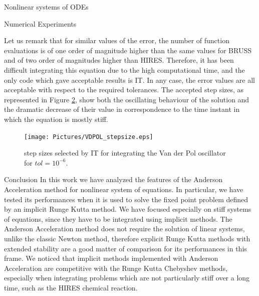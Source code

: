\documentclass{article}
\begin{document}
\begin{section}{Nonlinear systems of ODEs}
\begin{subsection}{Numerical Experiments}
\begin{figure}[t!]
\label{fig:VDPOL}
\end{figure}
Let us remark that for similar values of the error, the number of function evaluations is of one order of magnitude higher than the same values for BRUSS and of two order of magnitudes higher than HIRES. Therefore, it has been difficult integrating this equation due to the high computational time, and the only code which gave acceptable results is IT. In any case, the error values are all acceptable with respect to the required tolerances. The accepted step sizes, as represented in Figure \ref{fig:VDPOL_stps}, show both the oscillating behaviour of the solution and the dramatic decrease of their value in correspondence to the time instant in which the equation is mostly stiff.
\begin{figure}[t!]
\centering
\texttt{[image: Pictures/VDPOL\_stepsize.eps]}
\caption{step sizes selected by IT for integrating the Van der Pol oscillator for $tol = 10^{-6}$.}
\label{fig:VDPOL_stps}
\end{figure}
\end{subsection}
\end{section}

\begin{section}{Conclusion}
In this work we have analyzed the features of the Anderson Acceleration method for nonlinear system of equations. In particular, we have tested its performances when it is used to solve the fixed point problem defined by an implicit Runge Kutta method. We have focused especially on stiff systems of equations, since they have to be integrated using implicit methods. The Anderson Acceleration method does not require the solution of linear systems, unlike the classic Newton method, therefore explicit Runge Kutta methods with extended stability are a good matter of comparison for its performances in this frame. We noticed that implicit methods implemented with Anderson Acceleration are competitive with the Runge Kutta Chebyshev methods, especially when integrating problems which are not particularly stiff over a long time, such as the HIRES chemical reaction.

\end{section}

\clearpage

{}
\end{document}
